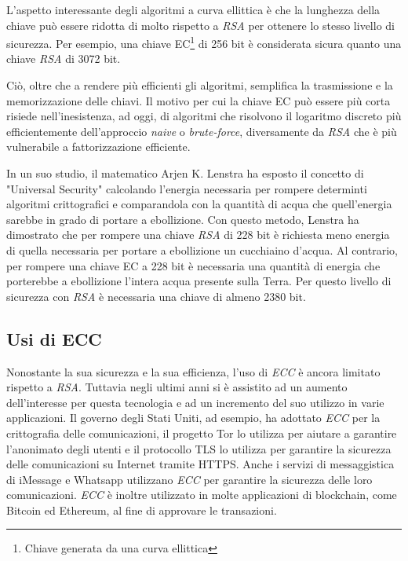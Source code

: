 L'aspetto interessante degli algoritmi a curva ellittica è che la lunghezza della chiave può essere ridotta di molto rispetto a \emph{RSA} per ottenere lo stesso livello di sicurezza.
Per esempio, una chiave EC\footnote{Chiave generata da una curva ellittica} di 256 bit è considerata sicura quanto una chiave \emph{RSA} di 3072 bit.

Ciò, oltre che a rendere più efficienti gli algoritmi, semplifica la trasmissione e la memorizzazione delle chiavi.
Il motivo per cui la chiave EC può essere più corta risiede nell'inesistenza, ad oggi, di algoritmi che risolvono il logaritmo discreto più efficientemente dell'approccio \emph{naive} o \emph{brute-force}, diversamente da \emph{RSA} che è più vulnerabile a fattorizzazione efficiente.

In un suo studio, il matematico Arjen K. Lenstra ha esposto il concetto di "Universal Security" calcolando l'energia necessaria per rompere determinti algoritmi crittografici e comparandola con la quantità di acqua che quell'energia sarebbe in grado di portare a ebollizione.
Con questo metodo, Lenstra ha dimostrato che per rompere una chiave \emph{RSA} di 228 bit è richiesta meno energia di quella necessaria per portare a ebollizione un cucchiaino d'acqua.
Al contrario, per rompere una chiave EC a 228 bit è necessaria una quantità di energia che porterebbe a ebollizione l'intera acqua presente sulla Terra.
Per questo livello di sicurezza con \emph{RSA} è necessaria una chiave di almeno 2380 bit.

\subsection{Usi di ECC}
Nonostante la sua sicurezza e la sua efficienza, l'uso di \emph{ECC} è ancora limitato rispetto a \emph{RSA}.
Tuttavia negli ultimi anni si è assistito ad un aumento dell'interesse per questa tecnologia e ad un incremento del suo utilizzo in varie applicazioni.
Il governo degli Stati Uniti, ad esempio, ha adottato \emph{ECC} per la crittografia delle comunicazioni, il progetto Tor lo utilizza per aiutare a garantire l'anonimato degli utenti e il protocollo TLS lo utilizza per garantire la sicurezza delle comunicazioni su Internet tramite HTTPS.
Anche i servizi di messaggistica di iMessage e Whatsapp utilizzano \emph{ECC} per garantire la sicurezza delle loro comunicazioni.
\emph{ECC} è inoltre utilizzato in molte applicazioni di blockchain, come Bitcoin ed Ethereum, al fine di approvare le transazioni.

